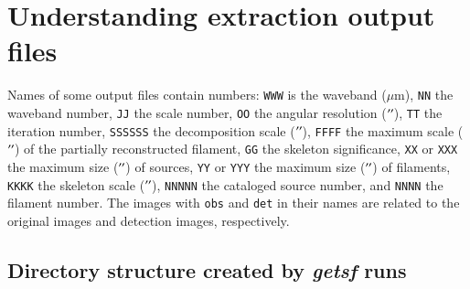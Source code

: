 \documentclass[a4paper,10pt]{article}
\newcommand*{\arcsec}{^{\prime\prime}\mkern-1.2mu}
\begin{document}

\section{Understanding extraction output files}
\label{output}

Names of some output files contain numbers: \verb!WWW! is the waveband ($\mu$m), \verb!NN! the waveband number, \verb!JJ! the scale
number, \verb!OO! the angular resolution ($\arcsec$), \verb!TT! the iteration number, \verb!SSSSSS! the decomposition scale
($\arcsec$), \verb!FFFF! the maximum scale ($\arcsec$) of the partially reconstructed filament, \verb!GG! the skeleton
significance, \verb!XX! or \verb!XXX! the maximum size ($\arcsec$) of sources, \verb!YY! or \verb!YYY! the maximum size ($\arcsec$)
of filaments, \verb!KKKK! the skeleton scale ($\arcsec$), \verb!NNNNN! the cataloged source number, and \verb!NNNN! the filament
number. The images with \verb!obs! and \verb!det! in their names are related to the original images and detection images,
respectively.


\subsection{Directory structure created by \textsl{getsf} runs}
\label{dirstructure}
\end{document}
